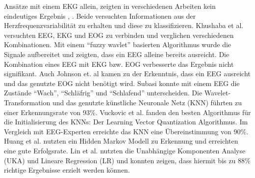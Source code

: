Ansätze mit einem EKG allein, zeigten in verschiedenen Arbeiten kein eindeutiges Ergebnis \cite{Vicente_6164509}, \cite{Rogado_4913155}. Beide versuchten Informationen aus der Herzfrequenzvariabilität zu erhalten und diese zu klassifizieren. 
Khushaba et al. \cite{Khushaba_5580017} versuchten EEG, EKG und EOG zu verbinden und verglichen verschiedenen Kombinationen. Mit einem "`fuzzy wavlet"' basierten Algorithmus wurde die Signale aufbereitet und zeigten, dass ein EEG alleine bereits ausreicht. Die Kombination eines EEG mit EKG bzw. EOG verbesserte das Ergebnis nicht signifikant. Auch Johnson et. al \cite{Johnson11} kamen zu der Erkenntnis, dass ein EEG ausreicht und das genutzte EOG nicht benötigt wird. 
Subasi \cite{Subasi:2005:ARA:1707423.1707550} konnte mit einem EEG die Zustände "`Wach"', "`Schläfrig"' und "`Schlafend"' unterscheiden. Die Wavelet-Transformation und das genutzte künstliche Neuronale Netz (KNN) führten zu einer Erkennungsrate von 93\%. Vuckovic et al. \cite{Vuckovic2002349} fanden den besten Algorithmus für die Initialisierung des KNNs: Der Learning Vector Quantization Algorithmus. Im Vergleich mit EEG-Experten erreichte das KNN eine Übereinstimmung von 90\%. Huang et al. \cite{Huang_548971} nutzten ein Hidden Markov Modell zu Erkennung und erreichten eine gute Erfolgsrate. 
Lin et al. \cite{Lin05eeg-baseddrowsiness} nutzten die Unabhängige Komponenten Analyse (UKA) und Lineare Regression (LR) und konnten zeigen, dass hiermit  bis zu 88\% richtige Ergebnisse erzielt werden können. 


